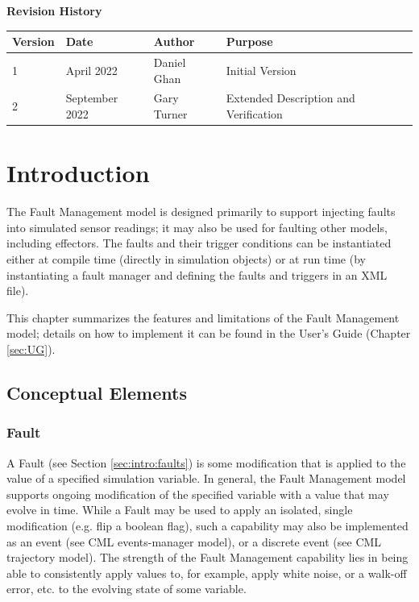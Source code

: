 \documentclass[11pt,fleqn]{report}
\begin{document}
\titlePage
\clearpage %
\tableofcontents %
\vfill
{\Large \textbf {Revision History}}
{\large
\begin{center}
\begin{tabular}{|l||l|l|l|}
\hline
 \textbf{Version} & \textbf{Date} & \textbf{Author} & \textbf{Purpose} \\ \hline
 \hline
1 & April 2022 & Daniel Ghan & Initial Version \\ \hline
2 & September 2022 & Gary Turner & Extended Description and Verification \\ \hline
\end{tabular}
\end{center}
}

\chapter{Introduction} %
\par The Fault Management model is designed primarily to support injecting
faults into simulated sensor readings; it may also be used for faulting
other models, including effectors.
The faults and their trigger conditions can be instantiated either at compile
time (directly in simulation objects) or at run time (by instantiating a fault
manager and defining the faults and triggers in an XML file).

\par This chapter summarizes the features and limitations of the Fault
Management model; details on how to implement it can be found in the User's
Guide (Chapter \ref{sec:UG}).

\section{Conceptual Elements} \label{intro_concept}
\subsection {Fault}
\par A Fault (see Section \ref{sec:intro:faults}) is some modification that is
applied to the value of a specified
simulation variable. In general, the Fault Management model supports ongoing
modification of the specified variable with a value that may evolve in time.
While a Fault may be used to apply an isolated, single modification (e.g. flip a
boolean flag), such a capability may also be implemented as an event (see CML
events-manager model), or a discrete event (see CML trajectory model). The
strength of the Fault Management capability lies in being able to consistently
apply values to, for example, apply white noise, or a walk-off error, etc. to
the evolving state of some variable.
\end{document}
